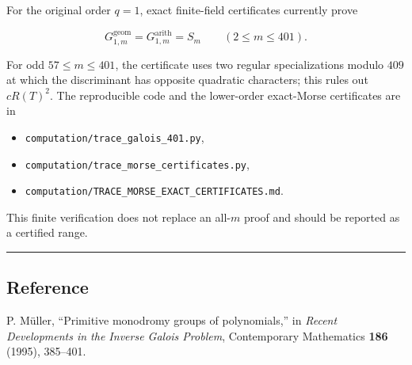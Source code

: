 For the original order \(q=1\), exact finite-field certificates currently
prove

\[
 G^{\mathrm{geom}}_{1,m}=G^{\mathrm{arith}}_{1,m}=S_m
 \qquad(2\leq m\leq401).
\]

For odd \(57\leq m\leq401\), the certificate uses two regular
specializations modulo \(409\) at which the discriminant has opposite
quadratic characters; this rules out \(cR(T)^2\). The reproducible code and
the lower-order exact-Morse certificates are in

\begin{itemize}
\tightlist
\item
  \texttt{computation/trace\_galois\_401.py},
\item
  \texttt{computation/trace\_morse\_certificates.py},
\item
  \texttt{computation/TRACE\_MORSE\_EXACT\_CERTIFICATES.md}.
\end{itemize}

This finite verification does not replace an all-\(m\) proof and should be
reported as a certified range.

\begin{center}\rule{0.5\linewidth}{0.5pt}\end{center}

\subsection{Reference}

P. Müller, ``Primitive monodromy groups of polynomials,'' in \emph{Recent
Developments in the Inverse Galois Problem}, Contemporary Mathematics \textbf{186}
(1995), 385--401.
